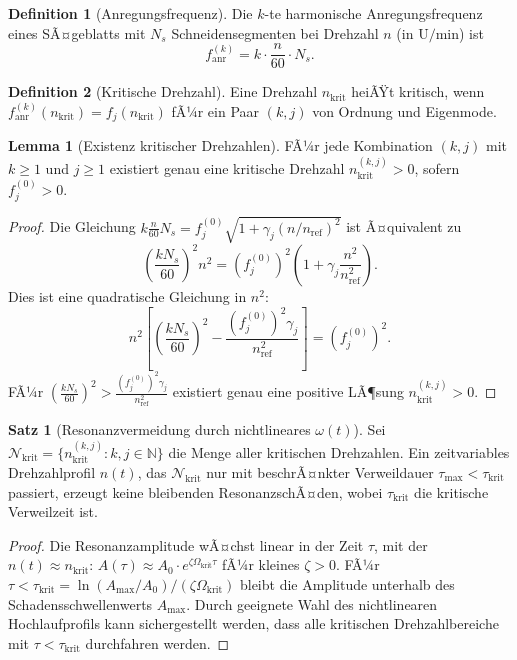 ﻿\documentclass[a4paper,12pt]{article}
\theoremstyle{definition}
\newtheorem{definition}{Definition}
\newtheorem{satz}{Satz}
\newtheorem{lemma}{Lemma}
\begin{document}
\begin{definition}[Anregungsfrequenz]
Die $k$-te harmonische Anregungsfrequenz eines SÃ¤geblatts mit $N_s$ Schneidensegmenten
bei Drehzahl $n$ (in $\mathrm{U/min}$) ist
\[
f_{\mathrm{anr}}^{(k)} = k \cdot \frac{n}{60} \cdot N_s.
\]
\end{definition}

\begin{definition}[Kritische Drehzahl]
Eine Drehzahl $n_{\mathrm{krit}}$ heiÃŸt kritisch, wenn $f_{\mathrm{anr}}^{(k)}(n_{\mathrm{krit}}) = f_j(n_{\mathrm{krit}})$
fÃ¼r ein Paar $(k, j)$ von Ordnung und Eigenmode.
\end{definition}

\begin{lemma}[Existenz kritischer Drehzahlen]
\label{lem:kritisch}
FÃ¼r jede Kombination $(k, j)$ mit $k \geq 1$ und $j \geq 1$ existiert genau eine
kritische Drehzahl $n_{\mathrm{krit}}^{(k,j)} > 0$, sofern $f_j^{(0)} > 0$.
\end{lemma}

\begin{proof}
Die Gleichung $k \frac{n}{60} N_s = f_j^{(0)}\sqrt{1 + \gamma_j(n/n_{\mathrm{ref}})^2}$
ist Ã¤quivalent zu
\[
\left(\frac{kN_s}{60}\right)^2 n^2 = (f_j^{(0)})^2\left(1 + \gamma_j\frac{n^2}{n_{\mathrm{ref}}^2}\right).
\]
Dies ist eine quadratische Gleichung in $n^2$:
\[
n^2\left[\left(\frac{kN_s}{60}\right)^2 - \frac{(f_j^{(0)})^2\gamma_j}{n_{\mathrm{ref}}^2}\right] = (f_j^{(0)})^2.
\]
FÃ¼r $\left(\frac{kN_s}{60}\right)^2 > \frac{(f_j^{(0)})^2\gamma_j}{n_{\mathrm{ref}}^2}$ existiert
genau eine positive LÃ¶sung $n_{\mathrm{krit}}^{(k,j)} > 0$.
\end{proof}

\begin{satz}[Resonanzvermeidung durch nichtlineares $\omega(t)$]
\label{satz:resonanzvermeidung}
Sei $\mathcal{N}_{\mathrm{krit}} = \{n_{\mathrm{krit}}^{(k,j)} : k,j \in \mathbb{N}\}$ die Menge aller
kritischen Drehzahlen. Ein zeitvariables Drehzahlprofil $n(t)$, das $\mathcal{N}_{\mathrm{krit}}$
nur mit beschrÃ¤nkter Verweildauer $\tau_{\max} < \tau_{\mathrm{krit}}$ passiert, erzeugt
keine bleibenden ResonanzschÃ¤den, wobei $\tau_{\mathrm{krit}}$ die kritische Verweilzeit ist.
\end{satz}

\begin{proof}
Die Resonanzamplitude wÃ¤chst linear in der Zeit $\tau$, mit der $n(t) \approx n_{\mathrm{krit}}$:
$A(\tau) \approx A_0 \cdot e^{\zeta \Omega_{\mathrm{krit}} \tau}$ fÃ¼r kleines $\zeta > 0$.
FÃ¼r $\tau < \tau_{\mathrm{krit}} = \ln(A_{\max}/A_0)/(\zeta\Omega_{\mathrm{krit}})$
bleibt die Amplitude unterhalb des Schadensschwellenwerts $A_{\max}$.
Durch geeignete Wahl des nichtlinearen Hochlaufprofils kann sichergestellt werden,
dass alle kritischen Drehzahlbereiche mit $\tau < \tau_{\mathrm{krit}}$ durchfahren werden.
\end{proof}
\end{document}
